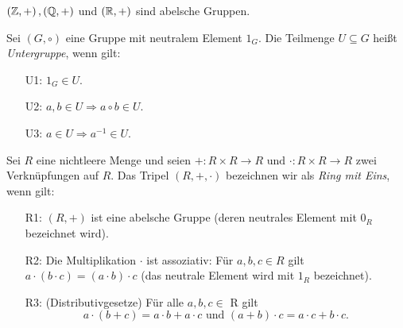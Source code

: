%
\begin{bsp}
$\left( \mathbb{Z}, +\right), \left(\mathbb{Q}, +\right)$ und $\left(\mathbb{R}, +\right)$ sind abelsche Gruppen. 
\end{bsp}
%
\begin{defn}\label{Untergruppe}
Sei $\left(G, \circ\right)$ eine Gruppe mit neutralem Element $1_G$. Die Teilmenge $U\subseteq G$ heißt \textit{Untergruppe}, wenn gilt:
\begin{enumerate}
\item[U1: ] $1_G \in U$.
\item[U2: ] $a, b \in U \Rightarrow a\circ b \in U$.
\item[U3: ] $a \in U \Rightarrow a^{-1} \in U$.
\end{enumerate} 
\end{defn}


\begin{defn}\label{Ring} %
Sei $R$ eine nichtleere Menge und seien $+ : R \times R \to R \text{ und } \cdot: R \times R \to R $ zwei Verknüpfungen auf $R$. Das Tripel $\left(R, +, \cdot\right)$ bezeichnen wir als \textit{Ring mit Eins}, wenn gilt:
%
\begin{enumerate}
\item[R1: ] $(R, +)$ ist eine abelsche Gruppe (deren neutrales Element mit $0_R$ bezeichnet wird).
\item[R2: ] Die Multiplikation $\cdot$ ist assoziativ: Für $a, b,c \in R$ gilt $a\cdot \left(b \cdot c\right) = \left(a \cdot b \right) \cdot c$ (das neutrale Element wird mit $1_R$ bezeichnet).%
\item[R3: ] (Distributivgesetze) Für alle $a,b,c \in$ R gilt\\
\[a \cdot(b +c) = a \cdot b + a \cdot c \text{ und }
(a+b) \cdot c = a \cdot c + b \cdot c. \] 
\end{enumerate}
\end{defn}

